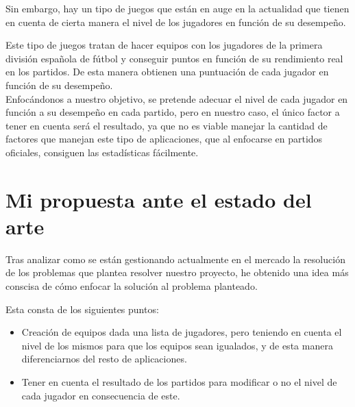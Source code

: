 Sin embargo, hay un tipo de juegos que están en auge en la actualidad que tienen en cuenta de cierta manera el nivel de los
jugadores en función de su desempeño.

Este tipo de juegos tratan de hacer equipos con los jugadores de la primera división española de fútbol y conseguir puntos en función
de su rendimiento real en los partidos. De esta manera obtienen una puntuación de cada jugador en función de su desempeño.\\

Enfocándonos a nuestro objetivo, se pretende adecuar el nivel de cada jugador en función a su desempeño en cada partido, pero en nuestro caso,
el único factor a tener en cuenta será el resultado, ya que no es viable manejar la cantidad de factores que manejan este tipo de aplicaciones,
que al enfocarse en partidos oficiales, consiguen las estadísticas fácilmente.

\section{Mi propuesta ante el estado del arte}

Tras analizar como se están gestionando actualmente en el mercado la resolución de los problemas que plantea resolver nuestro proyecto, he obtenido
una idea más conscisa de cómo enfocar la solución al problema planteado.

Esta consta de los siguientes puntos:

\begin{itemize}
    \item Creación de equipos dada una lista de jugadores, pero teniendo en cuenta el nivel de los mismos para que los equipos sean igualados, y de esta manera diferenciarnos
    del resto de aplicaciones.
    \item Tener en cuenta el resultado de los partidos para modificar o no el nivel de cada jugador en consecuencia de este.
\end{itemize}
